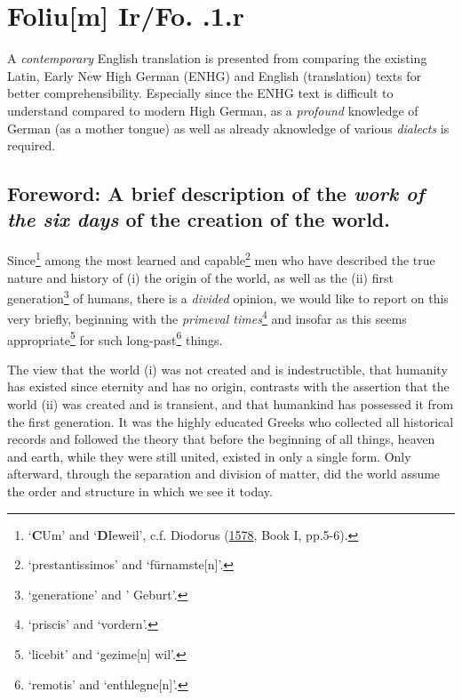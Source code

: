 \documentclass[
]{article}
\author{Dietmar Gerald Schrausser}
\date{09.05.2026}
\begin{document}
\hypertarget{folium-irfo.-.1.r}{%
\section{Foliu{[}m{]} Ir/Fo. .1.r}\label{folium-irfo.-.1.r}}

A \emph{contemporary} English translation is presented from comparing
the existing Latin, Early New High German (ENHG) and English
(translation) texts for better comprehensibility. Especially since the
ENHG text is difficult to understand compared to modern High German, as
a \emph{profound} knowledge of German (as a mother tongue) as well as
already aknowledge of various \emph{dialects} is required.

\hypertarget{foreword-a-brief-description-of-the-work-of-the-six-days-of-the-creation-of-the-world.}{%
\subsection{\texorpdfstring{Foreword: A brief description of the
\emph{work of the six days} of the creation of the
world.}{Foreword: A brief description of the work of the six days of the creation of the world.}}\label{foreword-a-brief-description-of-the-work-of-the-six-days-of-the-creation-of-the-world.}}

Since\footnote{`\textbf{C}Um' and `\textbf{D}Ieweil', c.f. Diodorus
  (\href{https://doi.org/10.3931/e-rara-35702}{1578}, Book I, pp.5-6).}
among the most learned and capable\footnote{`prestantissimos' and
  `fürnamste{[}n{]}'.} men who have described the true nature and
history of (i) the origin of the world, as well as the (ii) first
generation\footnote{`generatione' and ' Geburt'.} of humans, there is a
\emph{divided} opinion, we would like to report on this very briefly,
beginning with the \emph{primeval times}\footnote{`priscis' and
  `vordern'.} and insofar as this seems appropriate\footnote{`licebit'
  and `gezime{[}n{]} wil'.} for such long-past\footnote{`remotis' and
  `enthlegne{[}n{]}'.} things.

The view that the world (i) was not created and is indestructible, that
humanity has existed since eternity and has no origin, contrasts with
the assertion that the world (ii) was created and is transient, and that
humankind has possessed it from the first generation. It was the highly
educated Greeks who collected all historical records and followed the
theory that before the beginning of all things, heaven and earth, while
they were still united, existed in only a single form. Only afterward,
through the separation and division of matter, did the world assume the
order and structure in which we see it today.
\end{document}
